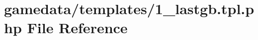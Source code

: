 \hypertarget{1__lastgb_8tpl_8php}{\section{gamedata/templates/1\+\_\+lastgb.tpl.\+php File Reference}
\label{1__lastgb_8tpl_8php}
}
